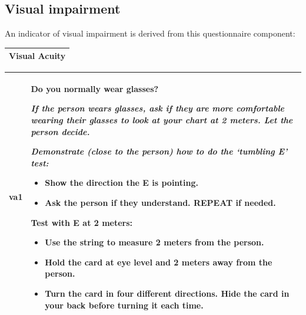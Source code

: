 \documentclass[12pt,a4paper]{book}
\providecommand{\tightlist}{%
  \setlength{\itemsep}{0pt}\setlength{\parskip}{0pt}}
\theoremstyle{definition}
\theoremstyle{definition}
\theoremstyle{definition}
\theoremstyle{remark}
\begin{document}
\hypertarget{visual-impairment}{%
\subsection{Visual impairment}\label{visual-impairment}}

An indicator of visual impairment is derived from this questionnaire
component:

\begin{longtable}[]{@{}c@{}}
\toprule
\begin{minipage}[t]{0.97\columnwidth}\centering
\textbf{Visual Acuity}\strut
\end{minipage}\tabularnewline
\bottomrule
\end{longtable}

\begin{longtable}[]{@{}ll@{}}
\toprule
\begin{minipage}[t]{0.48\columnwidth}\raggedright
va1\strut
\end{minipage} & \begin{minipage}[t]{0.48\columnwidth}\raggedright
Do you normally wear glasses?

\emph{If the person wears glasses, ask if they are more comfortable
wearing their glasses to look at your chart at 2 meters. Let the person
decide.}

\emph{Demonstrate (close to the person) how to do the `tumbling E'
test:}

\begin{itemize}
\tightlist
\item
  Show the direction the E is pointing.
\item
  Ask the person if they understand. REPEAT if needed.
\end{itemize}

Test with E at 2 meters:

\begin{itemize}
\tightlist
\item
  Use the string to measure 2 meters from the person.
\item
  Hold the card at eye level and 2 meters away from the person.
\item
  Turn the card in four different directions. Hide the card in your back
  before turning it each time.
\end{itemize}\strut
\end{minipage}\tabularnewline
\bottomrule
\end{longtable}
\end{document}
